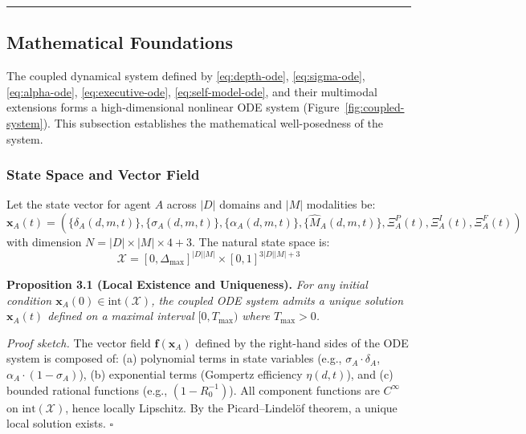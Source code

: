 \documentclass[11pt,a4paper]{article}
\begin{document}
\noindent\rule{\linewidth}{0.4pt}

\subsection{Mathematical Foundations}\label{sec:math-foundations}

The coupled dynamical system defined by \eqref{eq:depth-ode},
\eqref{eq:sigma-ode}, \eqref{eq:alpha-ode}, \eqref{eq:executive-ode},
\eqref{eq:self-model-ode}, and their multimodal extensions forms a
high-dimensional nonlinear ODE system (Figure~\ref{fig:coupled-system}). This subsection establishes the
mathematical well-posedness of the system.

\subsubsection{State Space and Vector Field}\label{sec:state-space}

Let the state vector for agent $A$ across $|D|$ domains and $|M|$
modalities be:
\begin{equation}\label{eq:state-vector}
\mathbf{x}_A(t) = \left(\{\delta_A(d,m,t)\}, \{\sigma_A(d,m,t)\}, \{\alpha_A(d,m,t)\}, \{\hat{M}_A(d,m,t)\}, \Xi_A^P(t), \Xi_A^I(t), \Xi_A^F(t)\right)
\end{equation}
with dimension $N = |D|\times|M|\times 4 + 3$. The natural state space is:
\begin{equation}\label{eq:state-space}
\mathcal{X} = [0, \Delta_{\max}]^{ |D||M| } \times [0,1]^{3|D||M| + 3}
\end{equation}

\textbf{Proposition 3.1 (Local Existence and Uniqueness).}
\textit{For any initial condition $\mathbf{x}_A(0) \in \text{int}(\mathcal{X})$,
the coupled ODE system admits a unique solution $\mathbf{x}_A(t)$ defined
on a maximal interval $[0, T_{\max})$ where $T_{\max} > 0$.}

\textit{Proof sketch.} The vector field $\mathbf{f}(\mathbf{x}_A)$ defined
by the right-hand sides of the ODE system is composed of: (a) polynomial
terms in state variables (e.g., $\sigma_A \cdot \delta_A$, $\alpha_A \cdot (1-\sigma_A)$),
(b) exponential terms (Gompertz efficiency $\eta(d,t)$), and (c) bounded
rational functions (e.g., $(1 - R_0^{-1})$). All component functions are
$C^\infty$ on $\text{int}(\mathcal{X})$, hence locally Lipschitz. By the
Picard--Lindel\"of theorem, a unique local solution exists. $\square$
\end{document}
